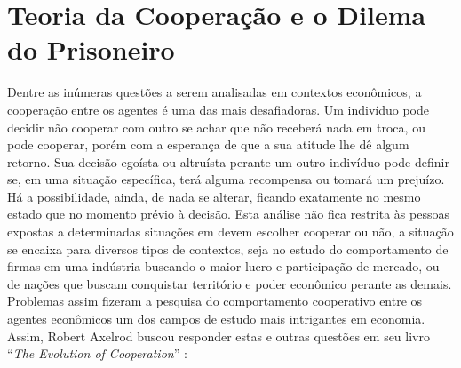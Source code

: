 \section{Teoria da Cooperação e o Dilema do Prisoneiro}

Dentre as inúmeras questões a serem analisadas em contextos econômicos, a cooperação entre os agentes é uma das mais desafiadoras. Um indivíduo pode decidir não cooperar com outro se achar que não receberá nada em troca, ou pode cooperar, porém com a esperança de que a sua atitude lhe dê algum retorno. Sua decisão egoísta ou altruísta perante um outro indivíduo pode definir se, em uma situação específica, terá alguma recompensa ou tomará um prejuízo. Há a possibilidade, ainda, de nada se alterar, ficando exatamente no mesmo estado que no momento prévio à decisão. Esta análise não fica restrita às pessoas expostas a determinadas situações em devem escolher cooperar ou não, a situação se encaixa para diversos tipos de contextos, seja no estudo do comportamento de firmas em uma indústria buscando o maior lucro e participação de mercado, ou de nações que buscam conquistar território e poder econômico perante as demais. Problemas assim fizeram a pesquisa do comportamento cooperativo entre os agentes econômicos um dos campos de estudo mais intrigantes em economia. Assim, Robert Axelrod buscou responder estas e outras questões em seu livro \enquote{\textit{The Evolution of Cooperation}} \cite{Axelrod84}:

